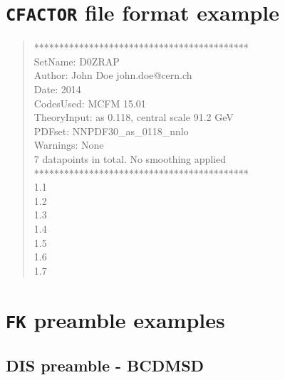 \documentclass[11pt]{article}
\begin{document}
\section{{\tt CFACTOR} file format example} \label{app:CFACexa}
\begin{quotation}\noindent
*******************************************\\
SetName: D0ZRAP\\
Author: John Doe john.doe@cern.ch \\
Date: 2014\\
CodesUsed: MCFM 15.01\\
TheoryInput: as 0.118, central scale 91.2 GeV\\
PDFset: NNPDF30\_as\_0118\_nnlo\\
Warnings: None\\
7 datapoints in total. 
No smoothing applied\\
*******************************************\\
 1.1\\
 1.2\\
 1.3\\
 1.4\\
 1.5\\
 1.6\\
 1.7 \\
\end{quotation}
\clearpage
\section{{\tt FK} preamble examples} \label{app:FKheaders}
\subsection{DIS preamble - BCDMSD}
\end{document}
